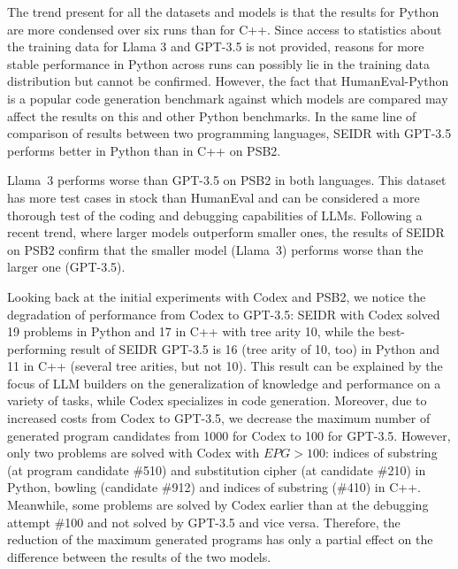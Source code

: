 The trend present for all the datasets and models is that the results for Python are more condensed over six runs than for C++. 
Since access to statistics about the training data for Llama 3 and GPT-3.5 is not provided, reasons for more stable performance in Python across runs can possibly lie in the training data distribution but cannot be confirmed. 
However, the fact that HumanEval-Python is a popular code generation benchmark against which models are compared may affect the results on this and other Python benchmarks.
In the same line of comparison of results between two programming languages, SEIDR with GPT-3.5 performs better in Python than in C++ on PSB2. 

% 
Llama~3 performs worse than GPT-3.5 on PSB2 in both languages.
This dataset has more test cases in stock than HumanEval and can be considered a more thorough test of the coding and debugging capabilities of LLMs. 
Following a recent trend, where larger models outperform smaller ones, the results of SEIDR on PSB2 confirm that the smaller model (Llama~3) performs worse than the larger one (GPT-3.5).

Looking back at the initial experiments with Codex and PSB2, we notice the degradation of performance from Codex to GPT-3.5: SEIDR with Codex solved 19 problems in Python and 17 in C++ with tree arity 10, while the best-performing result of SEIDR GPT-3.5 is 16 (tree arity of 10, too) in Python and 11 in C++ (several tree arities, but not 10). 
This result can be explained by the focus of LLM builders on the generalization of knowledge and performance on a variety of tasks, while Codex specializes in code generation.
Moreover, due to increased costs from Codex to GPT-3.5, we decrease the maximum number of generated program candidates from 1000 for Codex to 100 for GPT-3.5. 
However, only two problems are solved with Codex with $EPG > 100$: indices of substring (at program candidate \#510) and substitution cipher (at candidate \#210) in Python, bowling (candidate \#912) and indices of substring (\#410) in C++. 
Meanwhile, some problems are solved by Codex earlier than at the debugging attempt \#100 and not solved by GPT-3.5 and vice versa. 
Therefore, the reduction of the maximum generated programs has only a partial effect on the difference between the results of the two models. 


